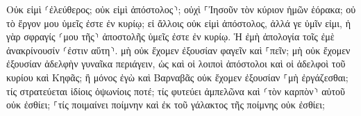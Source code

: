 \documentclass{openreader}
\begin{document}
Οὐκ εἰμὶ ⸂ἐλεύθερος; οὐκ εἰμὶ ἀπόστολος⸃; οὐχὶ ⸀Ἰησοῦν τὸν κύριον ἡμῶν ἑόρακα; οὐ τὸ ἔργον μου ὑμεῖς ἐστε ἐν κυρίῳ; 
εἰ ἄλλοις οὐκ εἰμὶ ἀπόστολος, ἀλλά γε ὑμῖν εἰμι, ἡ γὰρ σφραγίς ⸂μου τῆς⸃ ἀποστολῆς ὑμεῖς ἐστε ἐν κυρίῳ. 
Ἡ ἐμὴ ἀπολογία τοῖς ἐμὲ ἀνακρίνουσίν ⸂ἐστιν αὕτη⸃. 
μὴ οὐκ ἔχομεν ἐξουσίαν φαγεῖν καὶ ⸀πεῖν; 
μὴ οὐκ ἔχομεν ἐξουσίαν ἀδελφὴν γυναῖκα περιάγειν, ὡς καὶ οἱ λοιποὶ ἀπόστολοι καὶ οἱ ἀδελφοὶ τοῦ κυρίου καὶ Κηφᾶς; 
ἢ μόνος ἐγὼ καὶ Βαρναβᾶς οὐκ ἔχομεν ἐξουσίαν ⸀μὴ ἐργάζεσθαι; 
τίς στρατεύεται ἰδίοις ὀψωνίοις ποτέ; τίς φυτεύει ἀμπελῶνα καὶ ⸂τὸν καρπὸν⸃ αὐτοῦ οὐκ ἐσθίει; ⸀τίς ποιμαίνει ποίμνην καὶ ἐκ τοῦ γάλακτος τῆς ποίμνης οὐκ ἐσθίει; 
\end{document}
